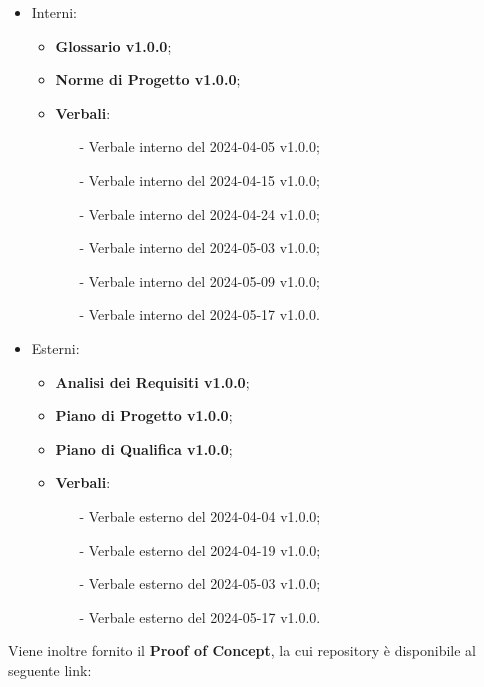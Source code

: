 \documentclass[8pt]{article}
\begin{document}
\begin{itemize}
    \item Interni:
\begin{itemize}
    \item \textbf{Glossario v1.0.0};
    \item \textbf{Norme di Progetto v1.0.0};
    \item \textbf{Verbali}:
    \begin{itemize}
			\item[-] Verbale interno del 2024-04-05 v1.0.0;
			\item[-] Verbale interno del 2024-04-15 v1.0.0;
			\item[-] Verbale interno del 2024-04-24 v1.0.0;	
			\item[-] Verbale interno del 2024-05-03 v1.0.0;
			\item[-] Verbale interno del 2024-05-09 v1.0.0;
			\item[-] Verbale interno del 2024-05-17 v1.0.0.
    \end{itemize}
\end{itemize}
    \item Esterni:
\begin{itemize}
    \item \textbf{Analisi dei Requisiti v1.0.0};
    \item \textbf{Piano di Progetto v1.0.0};
    \item \textbf{Piano di Qualifica v1.0.0};
    \item \textbf{Verbali}:
    \begin{itemize}
			\item[-] Verbale esterno del 2024-04-04 v1.0.0;
			\item[-] Verbale esterno del 2024-04-19 v1.0.0;
			\item[-] Verbale esterno del 2024-05-03 v1.0.0;
			\item[-] Verbale esterno del 2024-05-17 v1.0.0.
    \end{itemize}
\end{itemize}
\end{itemize}
\vspace{1em}
Viene inoltre fornito il \textbf{Proof of Concept}, la cui repository è disponibile al seguente link:
\end{document}
